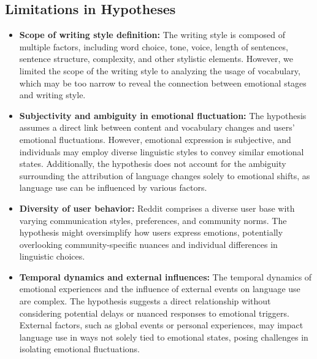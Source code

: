 \documentclass[conference,compsoc]{IEEEtran}
\begin{document}
\subsection{Limitations in Hypotheses}
\begin{itemize}
    \item \textbf{Scope of writing style definition: }The writing style is composed of multiple factors, including word choice, tone, voice, length of sentences, sentence structure, complexity, and other stylistic elements. However, we limited the scope of the writing style to analyzing the usage of vocabulary, which may be too narrow to reveal the connection between emotional stages and writing style.
    \item \textbf{Subjectivity and ambiguity in emotional fluctuation:} The hypothesis assumes a direct link between content and vocabulary changes and users' emotional fluctuations. However, emotional expression is subjective, and individuals may employ diverse linguistic styles to convey similar emotional states. Additionally, the hypothesis does not account for the ambiguity surrounding the attribution of language changes solely to emotional shifts, as language use can be influenced by various factors.
    \item \textbf{Diversity of user behavior:} Reddit comprises a diverse user base with varying communication styles, preferences, and community norms. The hypothesis might oversimplify how users express emotions, potentially overlooking community-specific nuances and individual differences in linguistic choices.
    \item \textbf{Temporal dynamics and external influences:} The temporal dynamics of emotional experiences and the influence of external events on language use are complex. The hypothesis suggests a direct relationship without considering potential delays or nuanced responses to emotional triggers. External factors, such as global events or personal experiences, may impact language use in ways not solely tied to emotional states, posing challenges in isolating emotional fluctuations.
\end{itemize}
\end{document}
